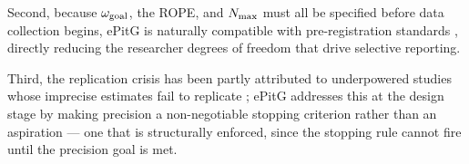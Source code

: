 Second, because $\omega_{\rm goal}$, the ROPE, and $N_{\rm max}$ must all be specified
before data collection begins, ePitG is naturally compatible with pre-registration
standards \citep{nosek2018}, directly reducing the researcher degrees of freedom that
drive selective reporting.

Third, the replication crisis has been partly attributed to underpowered studies whose
imprecise estimates fail to replicate \citep{osc2015, gelman2014}; ePitG addresses this
at the design stage by making precision a non-negotiable stopping criterion rather than
an aspiration --- one that is structurally enforced, since the stopping rule cannot fire
until the precision goal is met.
